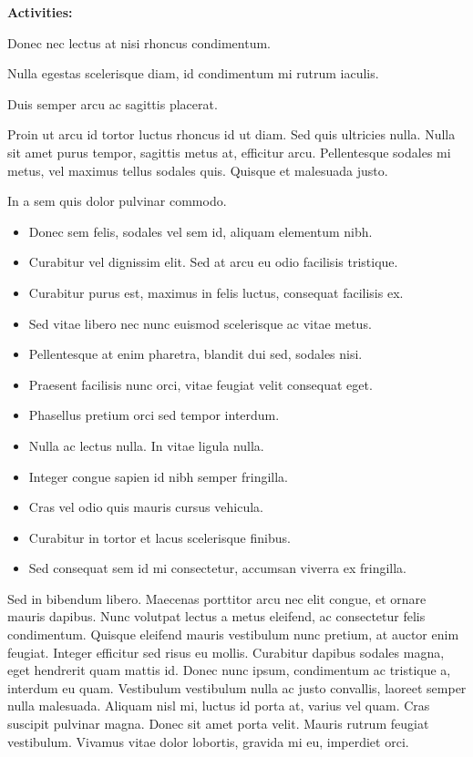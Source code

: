 \documentclass[
]{book}
\begin{document}
\textbf{Activities:}

Donec nec lectus at nisi rhoncus condimentum.

Nulla egestas scelerisque diam, id condimentum mi rutrum iaculis.

Duis semper arcu ac sagittis placerat.

Proin ut arcu id tortor luctus rhoncus id ut diam. Sed quis ultricies nulla. Nulla sit amet purus tempor, sagittis metus at, efficitur arcu. Pellentesque sodales mi metus, vel maximus tellus sodales quis. Quisque et malesuada justo.

In a sem quis dolor pulvinar commodo.

\begin{itemize}
\item
  Donec sem felis, sodales vel sem id, aliquam elementum nibh.
\item
  Curabitur vel dignissim elit. Sed at arcu eu odio facilisis tristique.
\item
  Curabitur purus est, maximus in felis luctus, consequat facilisis ex.
\item
  Sed vitae libero nec nunc euismod scelerisque ac vitae metus.
\item
  Pellentesque at enim pharetra, blandit dui sed, sodales nisi.
\item
  Praesent facilisis nunc orci, vitae feugiat velit consequat eget.
\item
  Phasellus pretium orci sed tempor interdum.
\item
  Nulla ac lectus nulla. In vitae ligula nulla.
\item
  Integer congue sapien id nibh semper fringilla.
\item
  Cras vel odio quis mauris cursus vehicula.
\item
  Curabitur in tortor et lacus scelerisque finibus.
\item
  Sed consequat sem id mi consectetur, accumsan viverra ex fringilla.
\end{itemize}

Sed in bibendum libero. Maecenas porttitor arcu nec elit congue, et ornare mauris dapibus. Nunc volutpat lectus a metus eleifend, ac consectetur felis condimentum. Quisque eleifend mauris vestibulum nunc pretium, at auctor enim feugiat. Integer efficitur sed risus eu mollis. Curabitur dapibus sodales magna, eget hendrerit quam mattis id. Donec nunc ipsum, condimentum ac tristique a, interdum eu quam. Vestibulum vestibulum nulla ac justo convallis, laoreet semper nulla malesuada. Aliquam nisl mi, luctus id porta at, varius vel quam. Cras suscipit pulvinar magna. Donec sit amet porta velit. Mauris rutrum feugiat vestibulum. Vivamus vitae dolor lobortis, gravida mi eu, imperdiet orci.
\end{document}
